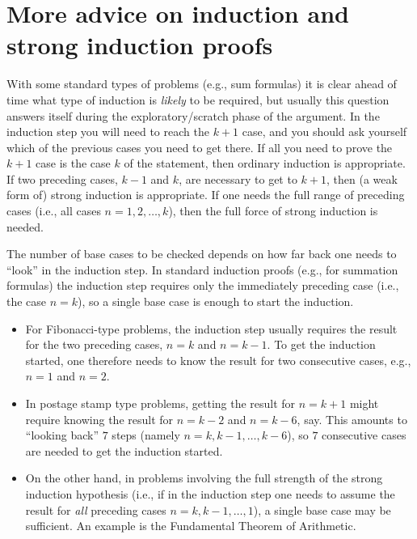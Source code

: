 \section{More advice on induction and strong induction proofs}
\label{sec:Induction:MoreAdviceAndStrongInduction}

\noindent
{}
With some standard types of problems (e.g., sum formulas) 
it is clear ahead of time what type of induction is \emph{likely} to be
required, but usually this question answers itself during 
the exploratory/scratch phase of the argument. In the induction step you
will need to reach the $k+1$ case, and you should ask yourself which of
the previous cases you need to get there. If all you need to prove the
$k+1$ case is the case $k$ of the statement, then ordinary induction is
appropriate. If two preceding cases, $k-1$ and $k$, are necessary to get
to $k+1$, then (a weak form of) strong induction is appropriate. If one
needs the full range of preceding cases (i.e., all cases
$n=1,2,\dots,k$), then the full force of strong induction is needed.


\noindent
{} 
The number of base cases to be checked depends on how far back one needs to
``look'' in the induction step. In standard induction proofs (e.g., for summation
formulas) the induction step requires only the immediately preceding case (i.e., the
case $n=k$), so a single base case is enough to start the induction.   
\begin{itemize}
\item 
For Fibonacci-type problems, 
the induction step usually requires the result for the two preceding cases,
$n=k$ and $n=k-1$. To get the induction started, one therefore needs to know 
the result for two consecutive cases, e.g., $n=1$ and $n=2$. 
\item 
In postage stamp type problems, getting the result for
$n=k+1$  might require knowing the result for $n=k-2$ and  
$n=k-6$, say. This amounts to ``looking back'' $7$ steps  (namely
$n=k,k-1,\dots,k-6$), so $7$ consecutive cases are needed to get the
induction started.
\item 
On the other hand, in problems involving the full strength of the strong
induction hypothesis (i.e., if in the induction step one needs to assume the
result for \emph{all} preceding cases $n=k,k-1,\dots,1$),  a single base
case may be sufficient.  An example is the Fundamental Theorem of
Arithmetic.
\end{itemize}

